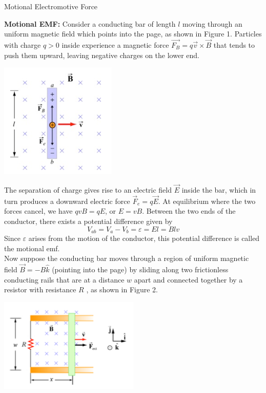 \documentclass{article}
\begin{document}
\begin{LARGE}
\begin{center}
Motional Electromotive Force
\end{center}
\end{LARGE}

\textbf{ Motional EMF:} Consider a conducting bar of length $ l $ moving through an uniform magnetic field which points into the page, as shown in Figure 1. Particles with charge $ q>0 $ inside experience a magnetic force $ \vec{F_{B}} = q\vec{v}\times \vec{B} $ that tends to push them upward, leaving negative charges on the lower end.
\begin{center}
\includegraphics{2018-08-03_152836.png}
\end{center}
The separation of charge gives rise to an electric field $ \vec{E} $ inside the bar, which in turn produces a downward electric force $ \vec{F}_{e} = q\vec{E} $. At equilibrium where the two forces cancel, we have $qvB = qE$, or $E = vB$. Between the two ends of the conductor, there exists a potential difference given by
\[V_{ab} = V_{a}-V_{b} = \varepsilon = El=Blv\]
Since $ \varepsilon $ arises from the motion of the conductor, this potential difference is called the
motional emf.\\
Now suppose the conducting bar moves through a region of uniform magnetic field $ \vec{B} = -B\hat{k} $ (pointing into the page) by sliding along two frictionless conducting rails that are at a distance $ w $ apart and connected together by a resistor with resistance $ R $ , as shown in Figure 2.
\begin{center}
\includegraphics[width=0.5\textwidth]{2018-08-03_152853.png}
\end{center}
\end{document}
